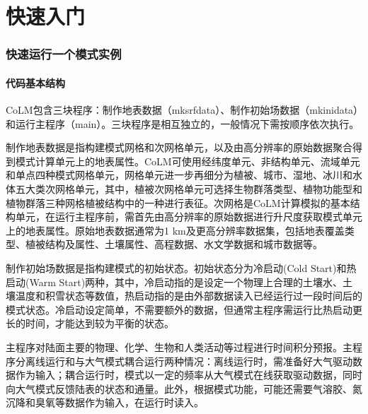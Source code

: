 \part{快速入门}
\section{快速运行一个模式实例}\label{chapter01}

\subsection{代码基本结构}

CoLM包含三块程序：制作地表数据（mksrfdata）、制作初始场数据（mkinidata）和运行主程序（main）。三块程序是相互独立的，一般情况下需按顺序依次执行。

制作地表数据是指构建模式网格和次网格单元，以及由高分辨率的原始数据聚合得到模式计算单元上的地表属性。CoLM可使用经纬度单元、非结构单元、流域单元和单点四种模式网格单元，网格单元进一步再细分为植被、城市、湿地、冰川和水体五大类次网格单元，其中，植被次网格单元可选择生物群落类型、植物功能型和植物群落三种网格植被结构中的一种进行表征。次网格是CoLM计算模拟的基本结构单元，在运行主程序前，需首先由高分辨率的原始数据进行升尺度获取模式单元上的地表属性。原始地表数据通常为1 km及更高分辨率数据集，包括地表覆盖类型、植被结构及属性、土壤属性、高程数据、水文学数据和城市数据等。

制作初始场数据是指构建模式的初始状态。初始状态分为冷启动(Cold Start)和热启动(Warm Start)两种，其中，冷启动指的是设定一个物理上合理的土壤水、土壤温度和积雪状态等数值，热启动指的是由外部数据读入已经运行过一段时间后的模式状态。冷启动设定简单，不需要额外的数据，但通常主程序需运行比热启动更长的时间，才能达到较为平衡的状态。

主程序对陆面主要的物理、化学、生物和人类活动等过程进行时间积分预报。主程序分离线运行和与大气模式耦合运行两种情况：离线运行时，需准备好大气驱动数据作为输入；耦合运行时，模式以一定的频率从大气模式在线获取驱动数据，同时向大气模式反馈陆表的状态和通量。此外，根据模式功能，可能还需要气溶胶、氮沉降和臭氧等数据作为输入，在运行时读入。

